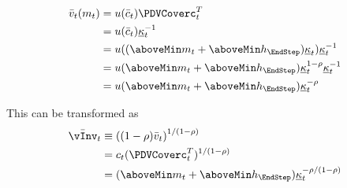   \begin{equation}\begin{gathered}\begin{aligned}
        \bar{\vFunc}_{\prd}(m_{\prd})  & = \uFunc(\bar{\cNrm}_{\prd})\PDVCoverc_{\prd}^{T}\label{eq:vFuncPF}
        \\  & = \uFunc(\bar{c}_{\prd}) \MPCmin_{\prd}^{-1} %
        \\  & = \uFunc((\aboveMin \mNrm_{\prd}+\aboveMin \hNrm_{\EndStep})\MPCmin_{\prd}) \MPCmin_{\prd}^{-1} %
        \\  & = \uFunc(\aboveMin \mNrm_{\prd}+\aboveMin \hNrm_{\EndStep})\MPCmin_{\prd}^{1-\CRRA} \MPCmin_{\prd}^{-1} %
        \\  & = \uFunc(\aboveMin \mNrm_{\prd}+\aboveMin \hNrm_{\EndStep})\MPCmin_{\prd}^{-\CRRA}  %
      \end{aligned}\end{gathered}\end{equation}

  This can be transformed as
  \begin{equation*}\begin{gathered}\begin{aligned}
        \bar{\vInv}_{\prd}  & \equiv  \left((1-\CRRA)\bar{\vFunc}_{\prd}\right)^{1/(1-\CRRA)}
        \\  & = \cNrm_{\prd}(\PDVCoverc_{\prd}^{T})^{1/(1-\CRRA)}
        \\  & = (\aboveMin \mNrm_{\prd}+\aboveMin \hNrm_{\EndStep})\MPCmin_{\prd}^{-\CRRA/(1-\CRRA)}   %
      \end{aligned}\end{gathered}\end{equation*}
